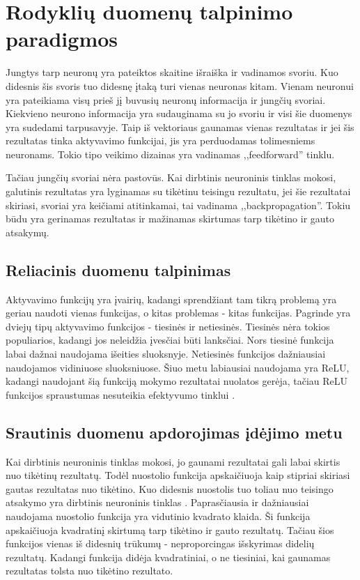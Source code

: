 \documentclass{VUMIFPSkursinis}
\begin{document}
\section{Rodyklių duomenų talpinimo paradigmos}
Jungtys tarp neuronų yra pateiktos skaitine išraiška ir vadinamos svoriu. Kuo didesnis šis svoris tuo didesnę įtaką turi vienas neuronas kitam.
Vienam neuronui yra pateikiama visų prieš jį buvusių neuronų informacija ir jungčių svoriai. Kiekvieno neurono informacija yra sudauginama su
jo svoriu ir visi šie duomenys yra sudedami tarpusavyje. Taip iš vektoriaus gaunamas vienas rezultatas ir jei šis rezultatas tinka aktyvavimo
funkcijai, jis yra perduodamas tolimesniems neuronams. Tokio tipo veikimo dizainas yra vadinamas ,,feedforward'' tinklu.

Tačiau jungčių svoriai nėra pastovūs. Kai dirbtinis neuroninis tinklas mokosi, galutinis rezultatas yra lyginamas su tikėtinu teisingu rezultatu, jei šie
rezultatai skiriasi, svoriai yra keičiami atitinkamai, tai vadinama ,,backpropagation''. Tokiu būdu yra gerinamas rezultatas ir mažinamas skirtumas
tarp tikėtino ir gauto atsakymų.

\subsection{Reliacinis duomenu talpinimas}
Aktyvavimo funkcijų yra įvairių, kadangi sprendžiant tam tikrą problemą yra geriau naudoti vienas funkcijas, o kitas problemas - kitas funkcijas.
Pagrinde yra dviejų tipų aktyvavimo funkcijos - tiesinės ir netiesinės. Tiesinės nėra tokios populiarios, kadangi jos neleidžia įvesčiai
būti lanksčiai. Nors tiesinė funkcija labai dažnai naudojama išeities sluoksnyje.
Netiesinės funkcijos dažniausiai naudojamos vidiniuose sluoksniuose. Šiuo metu labiausiai naudojama yra ReLU, kadangi naudojant šią funkciją mokymo
rezultatai nuolatos gerėja, tačiau ReLU funkcijos spraustumas nesuteikia efektyvumo tinklui \cite{DBLP:journals/corr/XuWCL15}.

\subsection{Srautinis duomenu apdorojimas įdėjimo metu}
Kai dirbtinis neuroninis tinklas mokosi, jo gaunami rezultatai gali labai skirtis nuo tikėtinų rezultatų. Todėl nuostolio funkcija apskaičiuoja kaip stipriai
skiriasi gautas rezultatas nuo tikėtino. Kuo didesnis nuostolis tuo toliau nuo teisingo atsakymo yra dirbtinis neuroninis tinklas \cite{Cameron-loss-fun}.
Paprasčiausia ir dažniausiai naudojama nuostolio funkcija yra vidutinio kvadrato klaida. Ši funkcija apskaičiuoja kvadratinį skirtumą tarp tikėtino 
ir gauto rezultatų. Tačiau šios funkcijos vienas iš didesnių trūkumų - neproporcingas išskyrimas didelių rezultatų. Kadangi funkcija didėja kvadratiniai,
o ne tiesiniai, kai gaunamas rezultatas tolsta nuo tikėtino rezultato.
\end{document}
